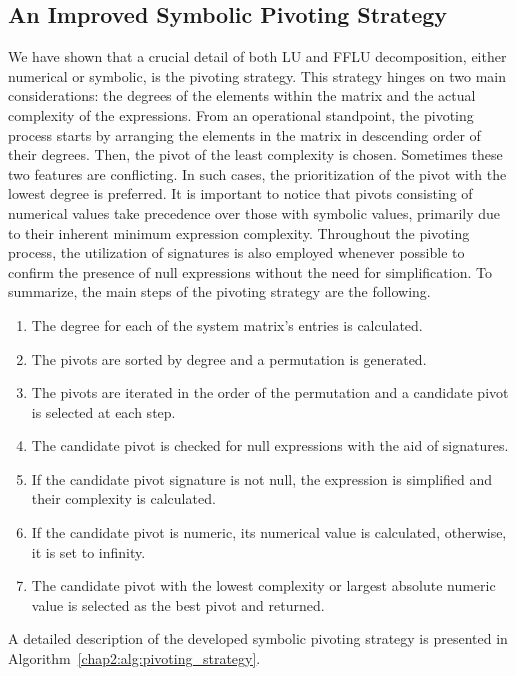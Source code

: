 \subsection{An Improved Symbolic Pivoting Strategy}

We have shown that a crucial detail of both \ac{LU} and \ac{FFLU} decomposition, either numerical or symbolic, is the pivoting strategy. This strategy hinges on two main considerations: the degrees of the elements within the matrix and the actual complexity of the expressions. From an operational standpoint, the pivoting process starts by arranging the elements in the matrix in descending order of their degrees. Then, the pivot of the least complexity is chosen. Sometimes these two features are conflicting. In such cases, the prioritization of the pivot with the lowest degree is preferred. It is important to notice that pivots consisting of numerical values take precedence over those with symbolic values, primarily due to their inherent minimum expression complexity. Throughout the pivoting process, the utilization of signatures is also employed whenever possible to confirm the presence of null expressions without the need for simplification. To summarize, the main steps of the pivoting strategy are the following.
%
\begin{enumerate}
  \setlength{\itemsep}{0.0em}
  \item The degree for each of the system matrix's entries is calculated.
  \item The pivots are sorted by degree and a permutation is generated.
  \item The pivots are iterated in the order of the permutation and a candidate pivot is selected at each step.
  \item The candidate pivot is checked for null expressions with the aid of signatures.
  \item If the candidate pivot signature is not null, the expression is simplified and their complexity is calculated.
  \item If the candidate pivot is numeric, its numerical value is calculated, otherwise, it is set to infinity.
  \item The candidate pivot with the lowest complexity or largest absolute numeric value is selected as the best pivot and returned.
\end{enumerate}
%
A detailed description of the developed symbolic pivoting strategy is presented in Algorithm~\ref{chap2:alg:pivoting_strategy}.


